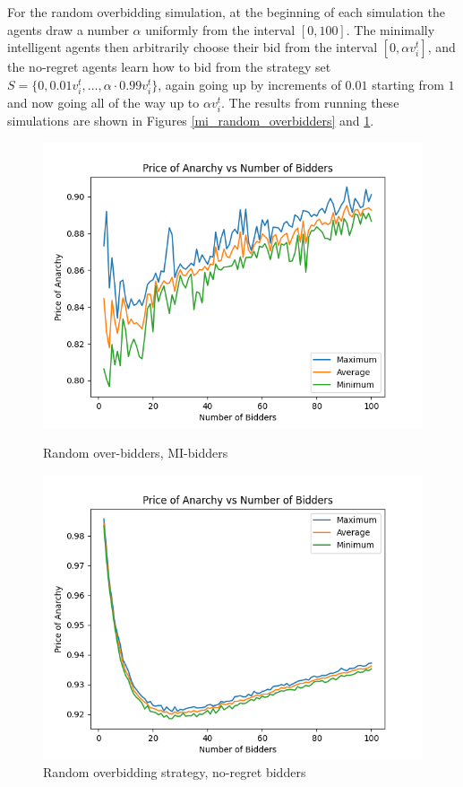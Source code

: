 \documentclass[12pt,twoside]{reedthesis}
\begin{document}
For the random overbidding simulation, at the beginning of each simulation the agents draw a number $\alpha$ uniformly from the interval $[0,100]$. The minimally intelligent agents then arbitrarily choose their bid from the interval $[0, \alpha v_i^t]$, and the no-regret agents learn how to bid from the strategy set $S = \{ 0, 0.01v_i^t, \ldots, \alpha \cdot 0.99 v_i^t \}$, again going up by increments of $0.01$ starting from $1$ and now going all of the way up to $\alpha v_i^t$. The results from running these simulations are shown in Figures \ref{mi_random_overbidders} and \ref{random_overbidders}.

\begin{figure}
	\centering
	\begin{minipage}{0.49\textwidth}
		\centering
		\includegraphics[scale=0.5]{Figures/zi_random_overbidding}
		\caption{Random over-bidders, MI-bidders}
		\label{mi_random_overbidders}
	\end{minipage}
	\begin{minipage}{0.49\textwidth}
		\centering
		\includegraphics[scale=0.5]{Figures/symmetric_random_overbidding}
		\caption{Random overbidding strategy, no-regret bidders}
		\label{random_overbidders}
	\end{minipage}
\end{figure}
\end{document}
